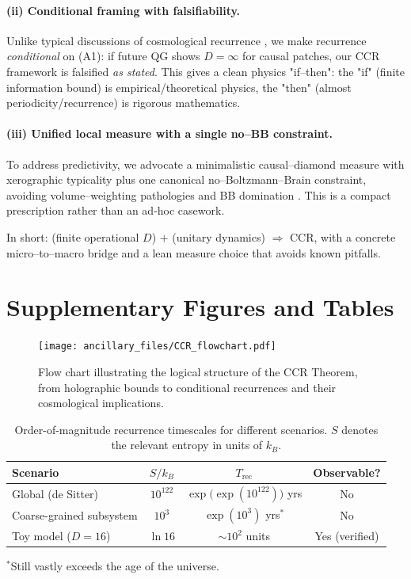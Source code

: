 \documentclass[12pt]{article}
\newcommand{\Trec}{T_{\text{rec}}}
\theoremstyle{remark}
\begin{document}
\paragraph{(ii) Conditional framing with falsifiability.}
Unlike typical discussions of cosmological recurrence \cite{DysonKlebanSusskind2002}, we make recurrence \emph{conditional} on (A1): if future QG shows $D=\infty$ for causal patches, our CCR framework is falsified \emph{as stated}. 
This gives a clean physics "if–then": the "if" (finite information bound) is empirical/theoretical physics, the "then" (almost periodicity/recurrence) is rigorous mathematics.

\paragraph{(iii) Unified local measure with a single no–BB constraint.}
To address predictivity, we advocate a minimalistic causal–diamond measure with xerographic typicality plus one canonical no–Boltzmann–Brain constraint, avoiding volume–weighting pathologies and BB domination \cite{DysonKlebanSusskind2002,Page2007}.
This is a compact prescription rather than an ad-hoc casework.

\noindent In short: (finite operational $D$) $+$ (unitary dynamics) $\Rightarrow$ CCR, with a concrete micro–to–macro bridge and a lean measure choice that avoids known pitfalls.




\nocite{*}

\appendix
\section{Supplementary Figures and Tables}

\begin{figure}[H]
    \centering
\texttt{[image: ancillary\_files/CCR\_flowchart.pdf]}
    \caption{Flow chart illustrating the logical structure of the CCR Theorem, from holographic bounds to conditional recurrences and their cosmological implications.}
    \label{fig:CCR_flowchart}
\end{figure}

\begin{table}[H]
\centering
\caption{Order-of-magnitude recurrence timescales for different scenarios. 
$S$ denotes the relevant entropy in units of $k_B$.}
\vspace{0.2cm}
\begin{tabular}{lccc}
\hline
\textbf{Scenario} & \textbf{$S/k_B$} & \textbf{$\Trec$} & \textbf{Observable?} \\
\hline
Global (de Sitter) & $10^{122}$ & $\exp\!\big(\exp(10^{122})\big)$ yrs & No \\
Coarse-grained subsystem & $10^{3}$ & $\exp(10^{3})$ yrs$^{\ast}$ & No \\
Toy model ($D=16$) & $\ln 16$ & $\sim 10^{2}$ units & Yes (verified) \\
\hline
\end{tabular}
\label{tab:timescales}
\end{table}
\vspace{-0.3cm}
{\footnotesize $^{\ast}$Still vastly exceeds the age of the universe.}
\end{document}
